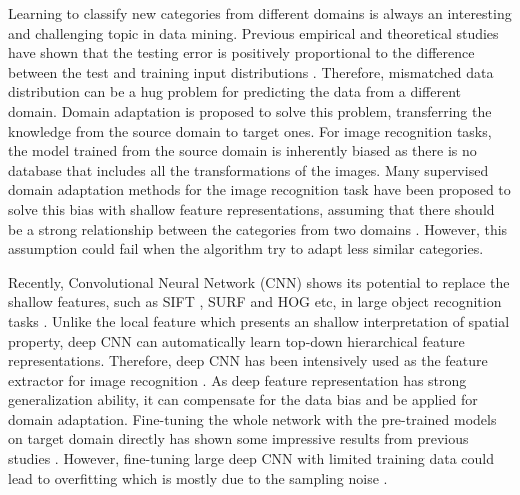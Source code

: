 ﻿Learning to classify new categories from different domains is always an interesting and challenging topic in data mining. 
Previous empirical and theoretical studies have shown that the testing error is positively proportional to the difference between the test and training input distributions \cite{ben2007analysis} \cite{blitzer2008learning}. Therefore, mismatched data distribution can be a hug problem for predicting the data from a different domain. Domain adaptation is proposed to solve this problem, transferring the knowledge from the source domain to target ones. For image recognition tasks, the model trained from the source domain is inherently biased as there is no database that includes all the transformations of the images. Many supervised domain adaptation methods for the image recognition task have been proposed to solve this bias with shallow feature representations, assuming that there should be a strong relationship between the categories from two domains \cite{daume2009frustratingly} \cite{yang2007adapting} \cite{aytar2011tabula}. However, this assumption could fail when the algorithm try to adapt less similar categories.

Recently, Convolutional Neural Network (CNN) shows its potential to replace the shallow features, such as SIFT \cite{lowe1999object}, SURF \cite{bay2006surf} and HOG \cite{dalal2005histograms} etc, in large object recognition tasks \cite{krizhevsky2012imagenet} \cite{zeiler2014visualizing} \cite{simonyan2014very}. Unlike the local feature which presents an shallow interpretation of spatial property, deep CNN can automatically learn top-down hierarchical feature representations. Therefore, deep CNN has been intensively used as the feature extractor for image recognition \cite{farabet2013learning}. As deep feature representation has strong generalization ability, it can compensate for the data bias and be applied for domain adaptation. Fine-tuning the whole network with the pre-trained models on target domain directly has shown some impressive results from previous studies \cite{Chatfield14} \cite{zeiler2014visualizing} \cite{hoffman2013one} \cite{NIPS2014_Zhou}. 
However, fine-tuning large deep CNN with limited training data could lead to overfitting which is mostly due to the sampling noise \cite{srivastava2014dropout}.

